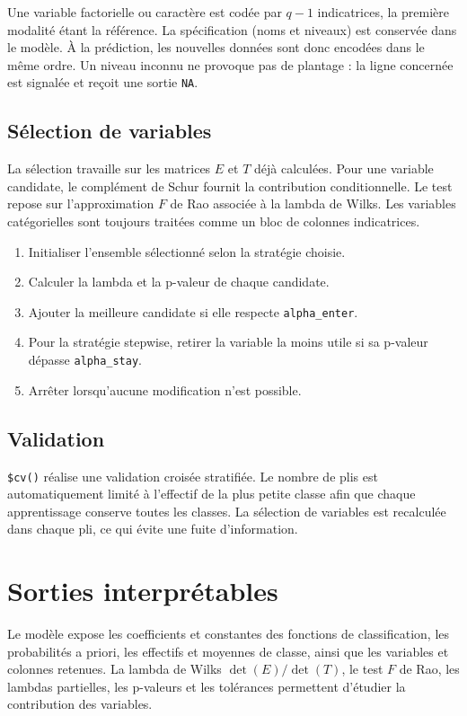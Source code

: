 \documentclass[11pt,a4paper]{article}
\begin{document}
Une variable factorielle ou caractère est codée par $q-1$ indicatrices, la
première modalité étant la référence. La spécification (noms et niveaux) est
conservée dans le modèle. À la prédiction, les nouvelles données sont donc
encodées dans le même ordre. Un niveau inconnu ne provoque pas de plantage :
la ligne concernée est signalée et reçoit une sortie \texttt{NA}.

\subsection{Sélection de variables}

La sélection travaille sur les matrices $E$ et $T$ déjà calculées. Pour une
variable candidate, le complément de Schur fournit la contribution
conditionnelle. Le test repose sur l'approximation $F$ de Rao associée à la
lambda de Wilks. Les variables catégorielles sont toujours traitées comme
un bloc de colonnes indicatrices.

\begin{enumerate}[label=\arabic*.]
\item Initialiser l'ensemble sélectionné selon la stratégie choisie.
\item Calculer la lambda et la p-valeur de chaque candidate.
\item Ajouter la meilleure candidate si elle respecte \texttt{alpha\_enter}.
\item Pour la stratégie stepwise, retirer la variable la moins utile si sa
      p-valeur dépasse \texttt{alpha\_stay}.
\item Arrêter lorsqu'aucune modification n'est possible.
\end{enumerate}

\subsection{Validation}

\texttt{\$cv()} réalise une validation croisée stratifiée. Le nombre de plis
est automatiquement limité à l'effectif de la plus petite classe afin que
chaque apprentissage conserve toutes les classes. La sélection de variables
est recalculée dans chaque pli, ce qui évite une fuite d'information.

\section{Sorties interprétables}

Le modèle expose les coefficients et constantes des fonctions de
classification, les probabilités a priori, les effectifs et moyennes de
classe, ainsi que les variables et colonnes retenues. La lambda de Wilks
\(\det(E)/\det(T)\), le test $F$ de Rao, les lambdas partielles, les
p-valeurs et les tolérances permettent d'étudier la contribution des
variables.
\end{document}
